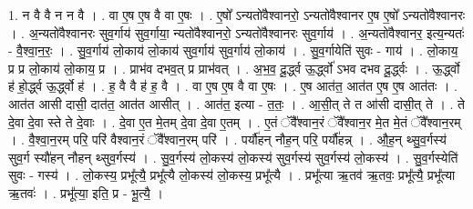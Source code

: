 \documentclass[17pt]{extarticle}
\begin{document}
1. न वै वै न न वै । . वा ए॒ष ए॒ष वै वा ए॒षः । . ए॒षो᳚ ऽन्यतो॑वैश्वानरो॒ ऽन्यतो॑वैश्वानर ए॒ष ए॒षो᳚ ऽन्यतो॑वैश्वानरः । . अ॒न्यतो॑वैश्वानरः सुव॒र्गाय॑ सुव॒र्गाया॒ न्यतो॑वैश्वानरो॒ ऽन्यतो॑वैश्वानरः सुव॒र्गाय॑ । . अ॒न्यतो॑वैश्वानर॒ इत्य॒न्यतः॑ - वै॒श्वा॒न॒रः॒ । . सु॒व॒र्गाय॑ लो॒काय॑ लो॒काय॑ सुव॒र्गाय॑ सुव॒र्गाय॑ लो॒काय॑ । . सु॒व॒र्गायेति॑ सुवः - गाय॑ । . लो॒काय॒ प्र प्र लो॒काय॑ लो॒काय॒ प्र । . प्राभ॑व दभव॒त् प्र प्राभ॑वत् । . अ॒भ॒व॒ दू॒र्द्ध्व ऊ॒र्द्ध्वो॑ ऽभव दभव दू॒र्द्ध्वः । . ऊ॒र्द्ध्वो ह॑ हो॒र्द्ध्व ऊ॒र्द्ध्वो ह॑ । . ह॒ वै वै ह॑ ह॒ वै । . वा ए॒ष ए॒ष वै वा ए॒षः । . ए॒ष आत॑त॒ आत॑त ए॒ष ए॒ष आत॑तः । . आत॑त आसी दासी॒ दात॑त॒ आत॑त आसीत् । . आत॑त॒ इत्या - त॒तः॒ । . आ॒सी॒त् ते त आ॑सी दासी॒त् ते । . ते दे॒वा दे॒वा स्ते ते दे॒वाः । . दे॒वा ए॒त मे॒तम् दे॒वा दे॒वा ए॒तम् । . ए॒तं ॅवै᳚श्वान॒रं ॅवै᳚श्वान॒र मे॒त मे॒तं ॅवै᳚श्वान॒रम् । . वै॒श्वा॒न॒रम् परि॒ परि॑ वैश्वान॒रं ॅवै᳚श्वान॒रम् परि॑ । . पर्यौ॑हन् नौह॒न् परि॒ पर्यौ॑हन्न् । . औ॒ह॒न् थ्सु॒व॒र्गस्य॑ सुव॒र्ग स्यौ॑हन् नौहन् थ्सुव॒र्गस्य॑ । . सु॒व॒र्गस्य॑ लो॒कस्य॑ लो॒कस्य॑ सुव॒र्गस्य॑ सुव॒र्गस्य॑ लो॒कस्य॑ । . सु॒व॒र्गस्येति॑ सुवः - गस्य॑ । . लो॒कस्य॒ प्रभू᳚त्यै॒ प्रभू᳚त्यै लो॒कस्य॑ लो॒कस्य॒ प्रभू᳚त्यै । . प्रभू᳚त्या ऋ॒तव॑ ऋ॒तवः॒ प्रभू᳚त्यै॒ प्रभू᳚त्या ऋ॒तवः॑ । . प्रभू᳚त्या॒ इति॒ प्र - भू॒त्यै॒ । \newline
\end{document}
